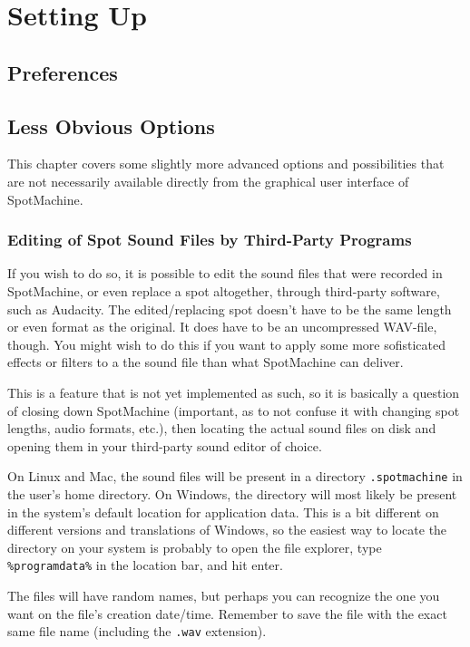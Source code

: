 \documentclass[a4paper,12pt]{report}
\begin{document}
\chapter{Setting Up}

\section{Preferences}


\section{Less Obvious Options}

This chapter covers some slightly more advanced options and possibilities that
are not necessarily available directly from the graphical user interface of
SpotMachine.

\subsection{Editing of Spot Sound Files by Third-Party Programs}

If you wish to do so, it is possible to edit the sound files that were recorded
in SpotMachine, or even replace a spot altogether, through third-party software,
such as Audacity. The edited/replacing spot doesn't have to be the same length
or even format as the original. It does have to be an uncompressed WAV-file,
though. You might wish to do this if you want to apply some more sofisticated
effects or filters to a the sound file than what SpotMachine can deliver.

This is a feature that is not yet implemented as such, so it is basically a
question of closing down SpotMachine (important, as to not confuse it with
changing spot lengths, audio formats, etc.), then locating the actual sound
files on disk and opening them in your third-party sound editor of choice.

On Linux and Mac, the sound files will be present in a directory
\texttt{.spotmachine} in the user's home directory. On Windows, the directory
will most likely be present in the system's default location for application
data. This is a bit different on different versions and translations of Windows,
so the easiest way to locate the directory on your system is probably to open
the file explorer, type \texttt{\%programdata\%} in the location bar, and hit enter.

The files will have random names, but perhaps you can recognize the one you
want on the file's creation date/time. Remember to save the file with the exact
same file name (including the \texttt{.wav} extension).
\end{document}

